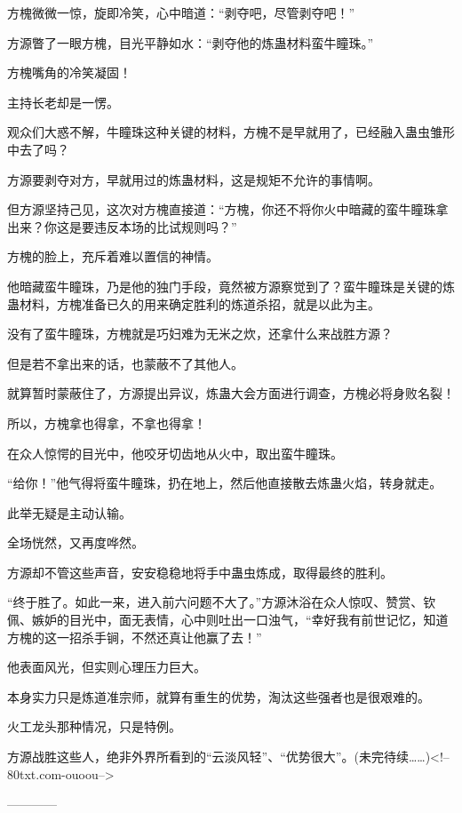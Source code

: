 \begin{this_body}
方槐微微一惊，旋即冷笑，心中暗道：“剥夺吧，尽管剥夺吧！”

方源瞥了一眼方槐，目光平静如水：“剥夺他的炼蛊材料蛮牛瞳珠。”

方槐嘴角的冷笑凝固！

主持长老却是一愣。

观众们大惑不解，牛瞳珠这种关键的材料，方槐不是早就用了，已经融入蛊虫雏形中去了吗？

方源要剥夺对方，早就用过的炼蛊材料，这是规矩不允许的事情啊。

但方源坚持己见，这次对方槐直接道：“方槐，你还不将你火中暗藏的蛮牛瞳珠拿出来？你这是要违反本场的比试规则吗？”

方槐的脸上，充斥着难以置信的神情。

他暗藏蛮牛瞳珠，乃是他的独门手段，竟然被方源察觉到了？蛮牛瞳珠是关键的炼蛊材料，方槐准备已久的用来确定胜利的炼道杀招，就是以此为主。

没有了蛮牛瞳珠，方槐就是巧妇难为无米之炊，还拿什么来战胜方源？

但是若不拿出来的话，也蒙蔽不了其他人。

就算暂时蒙蔽住了，方源提出异议，炼蛊大会方面进行调查，方槐必将身败名裂！

所以，方槐拿也得拿，不拿也得拿！

在众人惊愕的目光中，他咬牙切齿地从火中，取出蛮牛瞳珠。

“给你！”他气得将蛮牛瞳珠，扔在地上，然后他直接散去炼蛊火焰，转身就走。

此举无疑是主动认输。

全场恍然，又再度哗然。

方源却不管这些声音，安安稳稳地将手中蛊虫炼成，取得最终的胜利。

“终于胜了。如此一来，进入前六问题不大了。”方源沐浴在众人惊叹、赞赏、钦佩、嫉妒的目光中，面无表情，心中则吐出一口浊气，“幸好我有前世记忆，知道方槐的这一招杀手锏，不然还真让他赢了去！”

他表面风光，但实则心理压力巨大。

本身实力只是炼道准宗师，就算有重生的优势，淘汰这些强者也是很艰难的。

火工龙头那种情况，只是特例。

方源战胜这些人，绝非外界所看到的“云淡风轻”、“优势很大”。(未完待续……)<!--80txt.com-ouoou-->

------------

\end{this_body}

